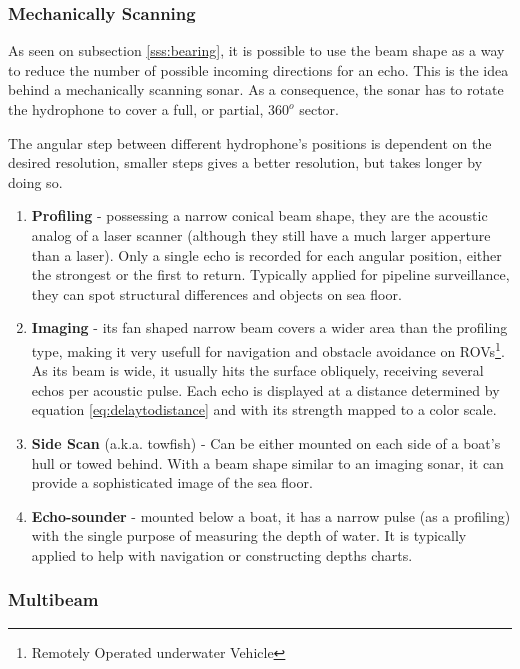 \subsubsection{Mechanically Scanning}

As seen on subsection \ref{sss:bearing}, it is possible to use the beam shape as
a way to reduce the number of possible incoming directions for an echo. This is
the idea behind a mechanically scanning sonar. As a consequence, the sonar has
to rotate the hydrophone to cover a full, or partial, $360^o$ sector.

The angular step between different hydrophone's positions is dependent on the
desired resolution, smaller steps gives a better resolution, but takes longer
by doing so.

\begin{enumerate}
  \item \textbf{Profiling} - possessing a narrow conical beam shape, they are the
  acoustic analog of a laser scanner (although they still have a much larger
  apperture than a laser). Only a single echo is recorded for each angular
  position, either the strongest or the first to return. Typically applied for
  pipeline surveillance, they can spot structural differences and objects on
  sea floor.
  \item \textbf{Imaging} - its fan shaped narrow beam covers a wider area than
  the profiling type, making it very usefull for navigation and obstacle
  avoidance on ROVs\footnote{Remotely Operated underwater Vehicle}. As its beam
  is wide, it usually hits the surface obliquely, receiving several echos per
  acoustic pulse. Each echo is displayed at a distance determined by equation
  \ref{eq:delaytodistance} and with its strength mapped to a color scale.
  \item \textbf{Side Scan} (a.k.a. towfish) - Can be either mounted on each side
  of a boat's hull or towed behind. With a beam shape similar to an imaging
  sonar, it can provide a sophisticated image of the sea floor.
  \item \textbf{Echo-sounder} - mounted below a boat, it has a narrow pulse
  (as a profiling) with the single purpose of measuring the depth of water. It
  is typically applied to help with navigation or constructing depths charts.
\end{enumerate}


\subsubsection{Multibeam}

